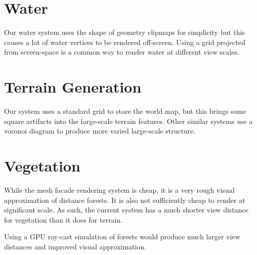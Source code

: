 \section{Water}

Our water system uses the shape of geometry clipmaps for simplicity but this causes a lot of water vertices to be rendered off-screen.
Using a grid projected from screen-space is a common way to render water at different view scales.


\section{Terrain Generation}

Our system uses a standard grid to store the world map, but this brings some square artifacts into the large-scale terrain features.
Other similar systems use a voronoi diagram to produce more varied large-scale structure.


\section{Vegetation}

While the mesh facade rendering system is cheap, it is a very rough visual approximation of distance forests.
It is also not sufficiently cheap to render at significant scale.
As such, the current system has a much shorter view distance for vegetation than it does for terrain.

Using a GPU ray-cast simulation of forests would produce much larger view distances and improved visual approximation. 
